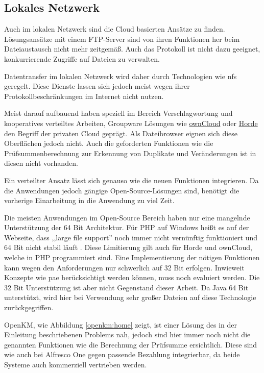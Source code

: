 \documentclass[oneside, ngerman, toc=bibliography,bibliography=totoc,listof=entryprefix, open=right,numbers=noenddot,fontsize=12pt]{scrbook}
\begin{document}
\subsection{Lokales Netzwerk}
Auch im lokalen Netzwerk sind die Cloud basierten Ansätze zu finden. Lösungsansätze mit einem FTP-Server sind von ihren Funktionen her beim Dateiaustausch nicht mehr zeitgemäß. Auch das Protokoll ist nicht dazu geeignet, konkurrierende Zugriffe auf Dateien zu verwalten.

Datentransfer im lokalen Netzwerk wird daher durch Technologien wie \acrshort{nfs} geregelt.
Diese Dienste lassen sich jedoch meist wegen ihrer Protokollbeschränkungen im Internet nicht nutzen.

Meist darauf aufbauend haben speziell im Bereich Verschlagwortung und kooperatives verteiltes Arbeiten, Groupware Lösungen wie \href{https://owncloud.org/}{{ownCloud}} oder \href{http://www.horde.org/apps/groupware}{{Horde}} den Begriff der privaten Cloud geprägt. Als Dateibrowser eignen sich diese Oberflächen jedoch nicht. Auch die geforderten Funktionen wie die Prüfsummenberechnung zur Erkennung von Duplikate und Veränderungen ist in diesen nicht vorhanden.

Ein verteilter Ansatz lässt sich genauso wie die neuen Funktionen integrieren. Da die Anwendungen jedoch gängige Open-Source-Lösungen sind, benötigt die vorherige Einarbeitung in die Anwendung zu viel Zeit. 

Die meisten Anwendungen im Open-Source Bereich haben nur eine mangelnde Unterstützung der 64 Bit Architektur. Für PHP auf Windows heißt es auf der Webseite, dass ,,large file support'' noch immer nicht vernünftig funktioniert und 64 Bit nicht stabil läuft \cite{phpw}. Diese Limitierung gilt auch für Horde und ownCloud, welche in PHP programmiert sind. Eine Implementierung der nötigen Funktionen kann wegen den Anforderungen nur schwerlich auf 32 Bit erfolgen. Inwieweit Konzepte wie \acrfull{pae} berücksichtigt werden können, muss noch evaluiert werden. Die 32 Bit Unterstützung ist aber nicht Gegenstand dieser Arbeit.
Da Java 64 Bit unterstützt, wird hier bei Verwendung sehr großer Dateien auf diese Technologie zurückgegriffen.

{OpenKM}, wie Abbildung \ref{openkm:home} zeigt, ist einer Lösung des in der Einleitung beschriebenen Problems nah, jedoch sind hier immer noch nicht die genannten Funktionen wie die Berechnung der Prüfsumme ersichtlich. Diese sind wie auch bei  {Alfresco One} gegen passende Bezahlung integrierbar, da beide Systeme auch kommerziell vertrieben werden.
\end{document}
